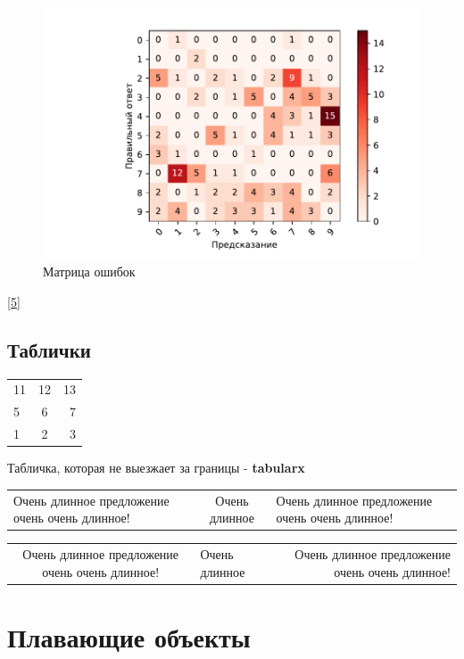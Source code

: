 \documentclass[a4paper, 12pt]{article}
\begin{document}
\begin{figure}
    \caption{Матрица ошибок}\label{confusion_matrix5}
    \includegraphics[width=\textwidth]{../conf_matrix_experiment_5_with_full_aug_on_train.pdf}
\end{figure}
\ref{5}

\subsection{Таблички}

\begin{tabular}{|l|c|r|}
    \hline 
    11 & 12 & 13 \\ 
    5 &  6 & 7  \\ 
    \hline 
    1 & 2 & 3 \\ 
    \hline 
\end{tabular} 

Табличка, которая не выезжает за границы - \textbf{tabularx}

\begin{tabularx}{\textwidth}{X|c|X}
    \hline
    Очень длинное предложение очень очень длинное! & Очень длинное & Очень длинное предложение очень очень длинное!
\end{tabularx}

\begin{tabulary}{\textwidth}{C|J|R}
     \hline
    Очень длинное предложение очень очень длинное! & Очень длинное & Очень длинное предложение очень очень длинное!
\end{tabulary}

\section{Плавающие объекты}
\end{document}
